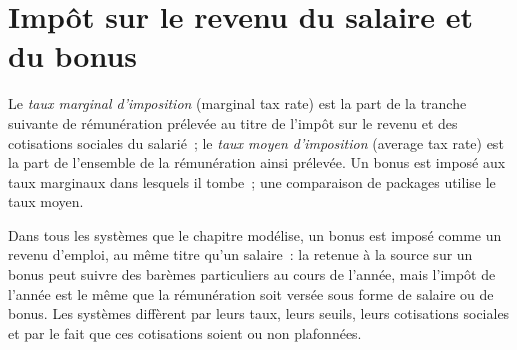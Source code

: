 \section{Impôt sur le revenu du salaire et du bonus}

\begin{definition}\label{def:in:pay-regulation-and-tax-by-location:rates}
Le \emph{taux marginal d'imposition} (marginal tax rate) est la part de la tranche suivante de rémunération prélevée au titre de l'impôt sur le revenu et
des cotisations sociales du salarié~; le \emph{taux moyen d'imposition} (average tax rate) est la part de l'ensemble de la rémunération ainsi
prélevée. Un bonus est imposé aux taux marginaux dans lesquels il tombe~; une comparaison de packages utilise le taux moyen.
\end{definition}

Dans tous les systèmes que le chapitre modélise, un bonus est imposé comme un revenu d'emploi, au même titre qu'un salaire~: la retenue à la source sur un bonus peut suivre
des barèmes particuliers au cours de l'année, mais l'impôt de l'année est le même que la rémunération soit versée sous forme de salaire ou de bonus. Les systèmes diffèrent par
leurs taux, leurs seuils, leurs cotisations sociales et par le fait que ces cotisations soient ou non plafonnées.

